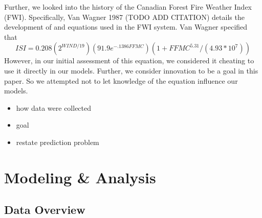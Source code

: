 \documentclass{article}
\begin{document}
Further, we looked into the history of the Canadian Forest Fire Weather Index (FWI). Specifically, Van Wagner 1987 (TODO ADD CITATION) details the development of and equations used in the FWI system. Van Wagner specified that $$ISI =  0.208(2^{WIND/19})(91.9e^{-.1386FFMC})(1+FFMC^{5.31}/(4.93*10^7))$$
However, in our initial assessment of this equation, we considered it cheating to use it directly in our models. Further, we consider innovation to be a goal in this paper. So we attempted not to let knowledge of the equation influence our models.

\begin{itemize}
\item how data were collected
\item goal
\item restate prediction problem

\end{itemize}
\section{Modeling \& Analysis}\label{Analysis}

\subsection{Data Overview}
\end{document}
